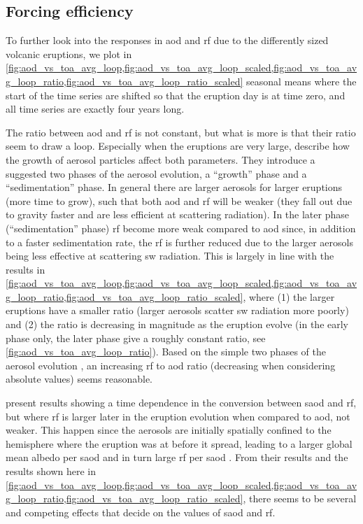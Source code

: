 \documentclass{ametsocV5}
\begin{document}
\subsection{Forcing efficiency}

To further look into the responses in \acrshort{aod} and \acrshort{rf} due to the
differently sized volcanic eruptions, we plot in
\cref{fig:aod_vs_toa_avg_loop,fig:aod_vs_toa_avg_loop_scaled,fig:aod_vs_toa_avg_loop_ratio,fig:aod_vs_toa_avg_loop_ratio_scaled}
seasonal means where the start of the time series are shifted so that the eruption day
is at time zero, and all time series are exactly four years long.


The ratio between \acrshort{aod} and \acrshort{rf} is not constant, but what is more is
that their ratio seem to draw a loop. Especially when the eruptions are very large,
\citet[][see their sections 3.1.2, 3.2.2]{marshall2019} describe how the growth of
aerosol particles affect both parameters. They introduce a suggested two phases of the
aerosol evolution, a ``growth'' phase and a ``sedimentation'' phase. In general there
are larger aerosols for larger eruptions (more time to grow), such that both
\acrshort{aod} and \acrshort{rf} will be weaker (they fall out due to gravity faster and
are less efficient at scattering radiation). In the later phase (``sedimentation''
phase) \acrshort{rf} become more weak compared to \acrshort{aod} since, in addition to a
faster sedimentation rate, the \acrshort{rf} is further reduced due to the larger
aerosols being less effective at scattering \acrshort{sw} radiation. This is largely in
line with the results in
\cref{fig:aod_vs_toa_avg_loop,fig:aod_vs_toa_avg_loop_scaled,fig:aod_vs_toa_avg_loop_ratio,fig:aod_vs_toa_avg_loop_ratio_scaled},
where (1) the larger eruptions have a smaller ratio (larger aerosols scatter
\acrshort{sw} radiation more poorly) and (2) the ratio is decreasing in magnitude as the
eruption evolve (in the early phase only, the later phase give a roughly constant ratio,
see \cref{fig:aod_vs_toa_avg_loop_ratio}). Based on the simple two phases of the aerosol
evolution \citep{marshall2019}, an increasing \acrshort{rf} to \acrshort{aod} ratio
(decreasing when considering absolute values) seems reasonable.

\citet[][their figure 1c,d]{marshall2020} present results showing a time dependence
in the conversion between \acrshort{saod} and \acrshort{rf}, but where
\acrshort{rf} is larger later in the eruption evolution when compared to
\acrshort{aod}, not weaker. This happen since the aerosols are initially spatially
confined to the hemisphere where the eruption was at before it spread, leading to a
larger global mean albedo per \acrshort{saod} and in turn large \acrshort{rf} per
\acrshort{saod} \citep{marshall2020}. From their results and the results shown here in
\cref{fig:aod_vs_toa_avg_loop,fig:aod_vs_toa_avg_loop_scaled,fig:aod_vs_toa_avg_loop_ratio,fig:aod_vs_toa_avg_loop_ratio_scaled},
there seems to be several and competing effects that decide on the values of
\acrshort{saod} and \acrshort{rf}.
\end{document}

